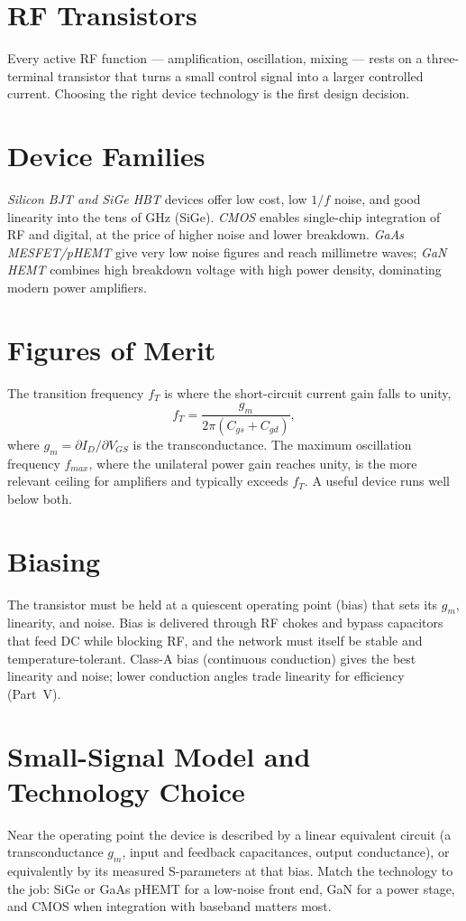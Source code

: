 \section{RF Transistors}\label{sec:tb_transistors}



Every active RF function --- amplification, oscillation, mixing --- rests on a
three-terminal transistor that turns a small control signal into a larger
controlled current. Choosing the right device technology is the first design
decision.

\section{Device Families}
\emph{Silicon BJT and SiGe HBT} devices offer low cost, low $1/f$ noise, and good
linearity into the tens of GHz (SiGe). \emph{CMOS} enables single-chip integration
of RF and digital, at the price of higher noise and lower breakdown. \emph{GaAs
MESFET/pHEMT} give very low noise figures and reach millimetre waves; \emph{GaN
HEMT} combines high breakdown voltage with high power density, dominating modern
power amplifiers.

\section{Figures of Merit}
The transition frequency $f_T$ is where the short-circuit current gain falls to
unity,
\[ f_T = \frac{g_m}{2\pi(C_{gs}+C_{gd})}, \]
where $g_m = \partial I_D/\partial V_{GS}$ is the transconductance. The maximum
oscillation frequency $f_{max}$, where the unilateral power gain reaches unity, is
the more relevant ceiling for amplifiers and typically exceeds $f_T$. A useful
device runs well below both.

\section{Biasing}
The transistor must be held at a quiescent operating point (bias) that sets its
$g_m$, linearity, and noise. Bias is delivered through RF chokes and bypass
capacitors that feed DC while blocking RF, and the network must itself be stable
and temperature-tolerant. Class-A bias (continuous conduction) gives the best
linearity and noise; lower conduction angles trade linearity for efficiency
(Part~V).

\section{Small-Signal Model and Technology Choice}
Near the operating point the device is described by a linear equivalent circuit
(a transconductance $g_m$, input and feedback capacitances, output conductance),
or equivalently by its measured S-parameters at that bias. Match the technology to
the job: SiGe or GaAs pHEMT for a low-noise front end, GaN for a power stage, and
CMOS when integration with baseband matters most.



